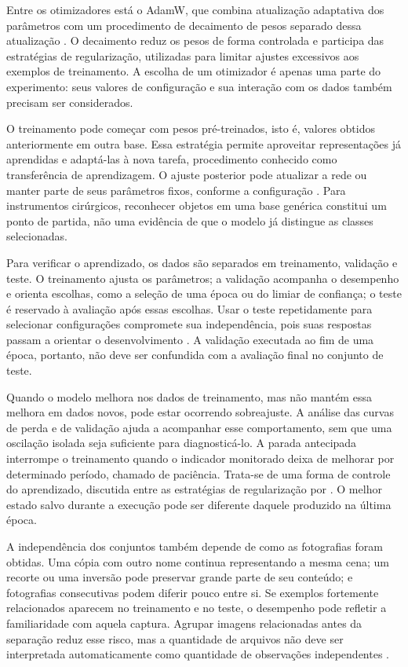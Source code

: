 Entre os otimizadores está o AdamW, que combina atualização adaptativa dos parâmetros com um procedimento de decaimento de pesos separado dessa atualização \parencite{loshchilov2019adamw}. O decaimento reduz os pesos de forma controlada e participa das estratégias de regularização, utilizadas para limitar ajustes excessivos aos exemplos de treinamento. A escolha de um otimizador é apenas uma parte do experimento: seus valores de configuração e sua interação com os dados também precisam ser considerados.

O treinamento pode começar com pesos pré-treinados, isto é, valores obtidos anteriormente em outra base. Essa estratégia permite aproveitar representações já aprendidas e adaptá-las à nova tarefa, procedimento conhecido como transferência de aprendizagem. O ajuste posterior pode atualizar a rede ou manter parte de seus parâmetros fixos, conforme a configuração \parencite{pytorchTransferencia}. Para instrumentos cirúrgicos, reconhecer objetos em uma base genérica constitui um ponto de partida, não uma evidência de que o modelo já distingue as classes selecionadas.

Para verificar o aprendizado, os dados são separados em treinamento, validação e teste. O treinamento ajusta os parâmetros; a validação acompanha o desempenho e orienta escolhas, como a seleção de uma época ou do limiar de confiança; o teste é reservado à avaliação após essas escolhas. Usar o teste repetidamente para selecionar configurações compromete sua independência, pois suas respostas passam a orientar o desenvolvimento \parencite{kapoor2023}. A validação executada ao fim de uma época, portanto, não deve ser confundida com a avaliação final no conjunto de teste.

Quando o modelo melhora nos dados de treinamento, mas não mantém essa melhora em dados novos, pode estar ocorrendo sobreajuste. A análise das curvas de perda e de validação ajuda a acompanhar esse comportamento, sem que uma oscilação isolada seja suficiente para diagnosticá-lo. A parada antecipada interrompe o treinamento quando o indicador monitorado deixa de melhorar por determinado período, chamado de paciência. Trata-se de uma forma de controle do aprendizado, discutida entre as estratégias de regularização por \textcite{goodfellow2016}. O melhor estado salvo durante a execução pode ser diferente daquele produzido na última época.

A independência dos conjuntos também depende de como as fotografias foram obtidas. Uma cópia com outro nome continua representando a mesma cena; um recorte ou uma inversão pode preservar grande parte de seu conteúdo; e fotografias consecutivas podem diferir pouco entre si. Se exemplos fortemente relacionados aparecem no treinamento e no teste, o desempenho pode refletir a familiaridade com aquela captura. Agrupar imagens relacionadas antes da separação reduz esse risco, mas a quantidade de arquivos não deve ser interpretada automaticamente como quantidade de observações independentes \parencite{kapoor2023}.


